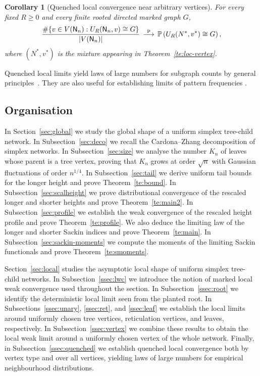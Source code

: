 \documentclass[english,11pt]{smfart}
\newcommand{\Prb}[1]{\mathbb{P}\left(#1\right)}
\newcommand{\convp}{\,{\buildrel \mathrm{p} \over \longrightarrow}\,}
\newcommand{\mN}{\mathsf{N}}
\newtheorem{corollary}[theorem]{Corollary}
\numberwithin{equation}{section}
\begin{document}
\begin{corollary}[Quenched local convergence near arbitrary vertices]
\label{co:loc-quenched-vertex}
For every fixed \(R\ge0\) and every finite rooted directed marked graph
\(G\),
\[
  \frac{
    \#\{v\in V(\mN_n):U_R(\mN_n,v)\cong G\}
  }{
    |V(\mN_n)|
  }
  \;\convp\;
  \Prb{U_R(N^*,v^*)\cong G},
\]
where \((N^*,v^*)\) is the mixture appearing in
Theorem~\ref{te:loc-vertex}.
\end{corollary}

Quenched local limits yield laws of large numbers for subgraph counts by
general principles~\cite{zbMATH07589157,zbMATH07696229}. They are also
useful for establishing limits of pattern frequencies
\cite{zbMATH07880797}.


\subsection*{Organisation}

In Section~\ref{sec:global} we study the global shape of a uniform simplex
tree-child network.  In Subsection~\ref{sec:deco} we recall the Cardona--Zhang decomposition of simplex networks. In Subsection~\ref{sec:size} we analyse the number $K_n$ of leaves whose parent is a tree vertex, proving that $K_n$ grows at order $\sqrt{n}$ with Gaussian fluctuations of order $n^{1/4}$. In Subsection~\ref{sec:tail} we derive uniform tail bounds for the longer height and prove Theorem~\ref{te:bound}. In Subsection~\ref{sec:scalheight} we prove distributional convergence of the rescaled longer and shorter heights and prove Theorem~\ref{te:main2}. In Subsection~\ref{sec:profile} we establish
the weak convergence of the rescaled height profile and prove Theorem~\ref{te:profile}. We also deduce the limiting law of the longer and shorter Sackin indices and prove Theorem~\ref{te:main}.  In
Subsection~\ref{sec:sackin-moments} we  compute the moments of the limiting
Sackin functionals and prove Theorem~\ref{te:smoments}. 
\smallskip

Section~\ref{sec:local} studies the asymptotic local shape of uniform
simplex tree-child networks. In Subsection~\ref{ssec:lwc} we introduce the
notion of marked local weak convergence used throughout the section. In
Subsection~\ref{ssec:root} we identify the deterministic local limit seen
from the planted root. In Subsections~\ref{ssec:unary}, \ref{ssec:ret},
and \ref{ssec:leaf} we establish the local limits around uniformly chosen
tree vertices, reticulation vertices, and leaves, respectively. In
Subsection~\ref{ssec:vertex} we combine these results to obtain the local
weak limit around a uniformly chosen vertex of the whole network. Finally,
in Subsection~\ref{ssec:quenched} we establish quenched local convergence
both by vertex type and over all vertices, yielding laws of large numbers
for empirical neighbourhood distributions.
\end{document}
